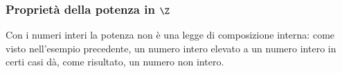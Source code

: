 \subsubsection{Proprietà della potenza in \(\Z\)}

Con i numeri interi la potenza non è una legge di composizione interna: 
come visto nell'esempio precedente, un numero intero elevato a un numero 
intero in certi casi dà, come risultato, un numero non intero.



